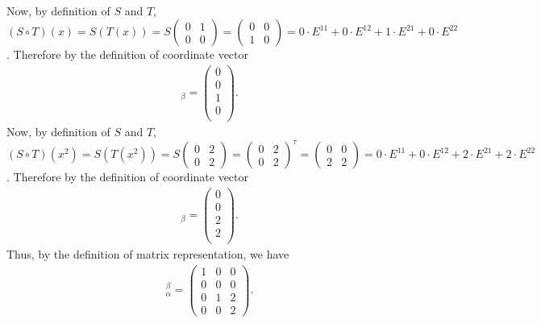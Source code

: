 \documentclass[12pt,answers]{exam}
\begin{document}
\begin{solution}
\begin{enumerate}[label=\roman*)]
\begin{align*}
\end{align*}
Now, by definition of $S$ and $T$, $(S\circ T)(x)=S(T(x))=S\begin{pmatrix} 0 & 1 \\ 0 & 0 \end{pmatrix}=\begin{pmatrix} 0 & 0 \\ 1 & 0 \end{pmatrix}=0\cdot E^{11}+0\cdot E^{12}+1\cdot E^{21}+0\cdot E^{22}$. Therefore by the definition of coordinate vector
\begin{align*}
    [(S\circ T)(x)]_{\beta}=\begin{pmatrix} 0 \\ 0 \\ 1 \\ 0 \\ \end{pmatrix}.
\end{align*}
Now, by definition of $S$ and $T$, $(S\circ T)(x^2)=S(T(x^2))=S\begin{pmatrix} 0 & 2 \\ 0 & 2 \end{pmatrix}=\begin{pmatrix} 0 & 2 \\ 0 & 2 \end{pmatrix}^{\tau}=\begin{pmatrix} 0 & 0 \\ 2 & 2 \end{pmatrix}=0\cdot E^{11}+0\cdot E^{12}+2\cdot E^{21}+2\cdot E^{22}$. Therefore by the definition of coordinate vector
\begin{align*}
    [(S\circ T)(x^2)]_{\beta}=\begin{pmatrix} 0 \\ 0 \\ 2 \\ 2 \\ \end{pmatrix}.
\end{align*}
Thus, by the definition of matrix representation, we have
\begin{align*}
    [(S\circ T)]^{\beta}_{\alpha}=\begin{pmatrix} 1 & 0 & 0 \\
                                                  0 & 0 & 0 \\
                                                  0 & 1 & 2 \\
                                                  0 & 0 & 2 \end{pmatrix}.

\end{align*}
\end{enumerate}
\end{solution}
\end{document}
